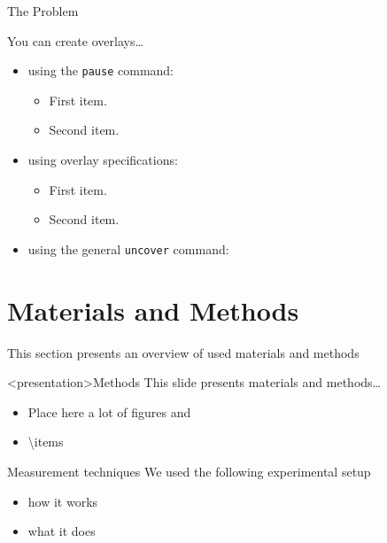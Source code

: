   \begin{frame}{The Problem}
  

    You can create\cite{webb_laser-raman_1980} overlays\dots
    \begin{itemize}
    \item using the \texttt{pause} command:
      \begin{itemize}
      \item
        First item.
        \pause
      \item    
        Second item.
      \end{itemize}
    \item
      using overlay specifications:
      \begin{itemize}
      \item<3->
        First item.
      \item<4->
        Second item.
      \end{itemize}
    \item
      using the general \texttt{uncover} command:
      \begin{itemize}
      \end{itemize}
    \end{itemize}
  \end{frame}


\section{Materials and Methods}
  This section presents an overview of used materials and methods
  \begin{frame}<presentation>{Methods}
    This slide presents materials and methods\ldots
    \begin{itemize}
      \item Place here a lot of figures and
      \item \textbackslash{}items
    \end{itemize}
  \end{frame}

  \begin{frame}{Measurement techniques}
    We used the following experimental setup
    \begin{itemize}
      \item how it works
      \item what it does
    \end{itemize}
  \end{frame}

